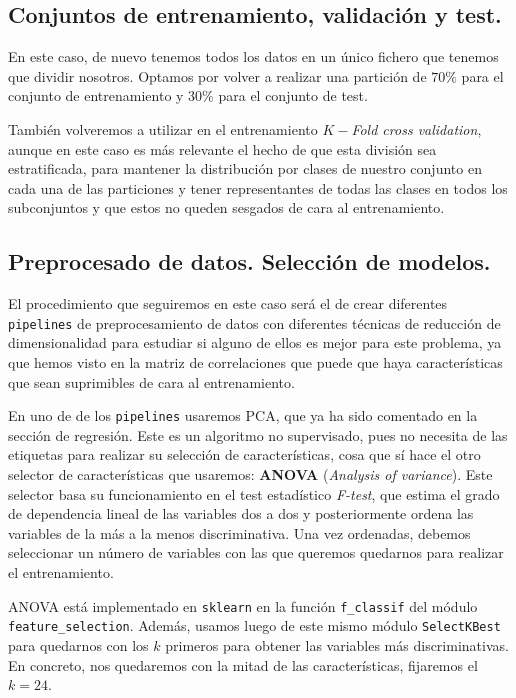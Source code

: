 \documentclass[a4paper, 20pt]{article}
\begin{document}
\subsection{Conjuntos de entrenamiento, validación y test.}

En este caso, de nuevo tenemos todos los datos en un único fichero que tenemos que dividir nosotros. Optamos por volver a realizar una partición de $70\%$ para el conjunto de entrenamiento y $30\%$ para el conjunto de test.

También volveremos a utilizar en el entrenamiento $K-$\emph{Fold cross validation}, aunque en este caso es más relevante el hecho de que esta división sea estratificada, para mantener la distribución por clases de nuestro conjunto en cada una de las particiones y tener representantes de todas las clases en todos los subconjuntos y que estos no queden sesgados de cara al entrenamiento.

\subsection{Preprocesado de datos. Selección de modelos.}

El procedimiento que seguiremos en este caso será el de crear diferentes \lstinline{pipelines} de preprocesamiento de datos con diferentes técnicas de reducción de dimensionalidad para estudiar si alguno de ellos es mejor para este problema, ya que hemos visto en la matriz de correlaciones que puede que haya características que sean suprimibles de cara al entrenamiento.

En uno de de los \lstinline{pipelines} usaremos PCA, que ya ha sido comentado en la sección de regresión. Este es un algoritmo no supervisado, pues no necesita de las etiquetas para realizar su selección de características, cosa que sí hace el otro selector de características que usaremos: \textbf{ANOVA} (\emph{Analysis of variance}). Este selector basa su funcionamiento en el test estadístico \emph{F-test}, que estima el grado de dependencia lineal de las variables dos a dos y posteriormente ordena las variables de la más a la menos discriminativa. Una vez ordenadas, debemos seleccionar un número de variables con las que queremos quedarnos para realizar el entrenamiento.

ANOVA está implementado en \lstinline{sklearn} en la función \lstinline{f_classif} del módulo \lstinline{feature_selection}. Además, usamos luego de este mismo módulo  \lstinline{SelectKBest} para quedarnos con los $k$ primeros para obtener las variables más discriminativas. En concreto, nos quedaremos con la mitad de las características, fijaremos el $k = 24$.
\end{document}
